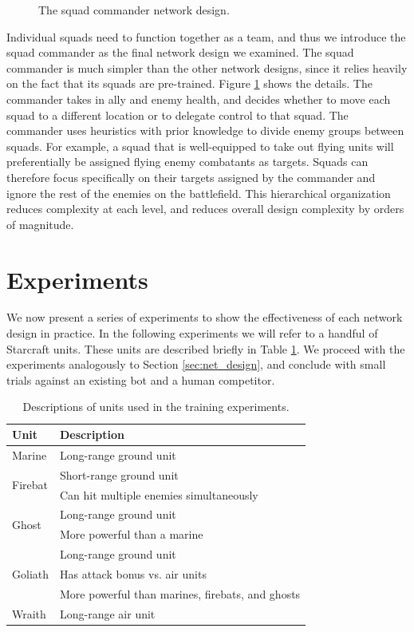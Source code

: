 \documentclass[a4paper]{article}
\begin{document}
\begin{figure}

\caption{The squad commander network design.}
\label{fig:quad_commander_design}
\end{figure}

Individual squads need to function together as a team, and thus we introduce the squad commander as the final network design we examined. The squad commander is much simpler than the other network designs, since it relies heavily on the fact that its squads are pre-trained. Figure \ref{fig:quad_commander_design} shows the details. The commander takes in ally and enemy health, and decides whether to move each squad to a different location or to delegate control to that squad. The commander uses heuristics with prior knowledge to divide enemy groups between squads. For example, a squad that is well-equipped to take out flying units will preferentially be assigned flying enemy combatants as targets. Squads can therefore focus specifically on their targets assigned by the commander and ignore the rest of the enemies on the battlefield. This hierarchical organization reduces complexity at each level, and reduces overall design complexity by orders of magnitude.

\section{Experiments}
\label{sec:exp}

We now present a series of experiments to show the effectiveness of each network design in practice. In the following experiments we will refer to a handful of Starcraft units. These units are described briefly in Table \ref{tab:units}. We proceed with the experiments analogously to Section \ref{sec:net_design}, and conclude with small trials against an existing bot and a human competitor.

\begin{table}
\centering
\begin{tabular}{|l|l|}
	\hline
	{\bf Unit} & {\bf Description} \\ \hline
	Marine & Long-range ground unit \\ \hline
	\multirow{2}{*}{Firebat} & Short-range ground unit \\
	& Can hit multiple enemies simultaneously \\ \hline
	\multirow{2}{*}{Ghost} & Long-range ground unit \\
	& More powerful than a marine\\ \hline
	\multirow{3}{*}{Goliath} & Long-range ground unit \\
	& Has attack bonus vs. air units \\
	& More powerful than marines, firebats, and ghosts \\ \hline
	Wraith & Long-range air unit \\ \hline
\end{tabular}
\caption{Descriptions of units used in the training experiments.}
\label{tab:units}
\end{table}
	
\end{document}
